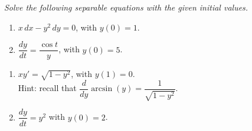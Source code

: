 \documentclass[10pt]{article}
\begin{document}
\noindent
\textit{Solve the following separable equations with the given initial values.}

\begin{multicols}{2}
\begin{enumerate}
\setcounter{enumi}{\theenumCount}
\item $x \, dx - y^2 \, dy = 0$, with $y(0) = 1$. 


\item $\dfrac{dy}{dt} = \dfrac{\cos t}{y}$, with $y(0) = 5$.

\setcounter{enumCount}{\theenumi}
\end{enumerate} 
\end{multicols}

\vfill
\vfill

\begin{multicols}{2}
\begin{enumerate}
\setcounter{enumi}{\theenumCount}
\item $xy' = \sqrt{1-y^2}$, with $y(1) = 0$. \\ \vfill
Hint: recall that $\dfrac{d}{dy} \arcsin(y) = \dfrac{1}{\sqrt{1 - y^2}}$. 



\item $\dfrac{dy}{dt} = y^2$ with $y(0) = 2$.  

\setcounter{enumCount}{\theenumi}
\end{enumerate} 
\end{multicols}

\vfill
\vfill
\vfill
\end{document}
